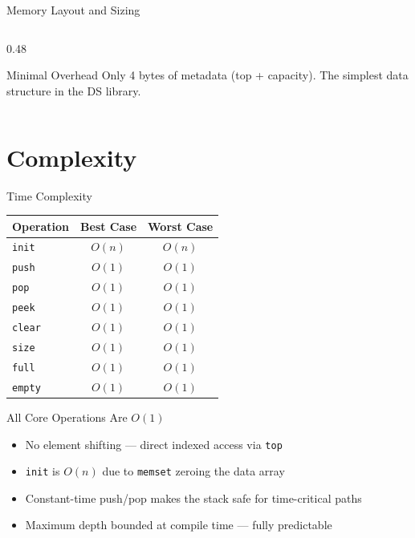 \documentclass[aspectratio=169, 10pt]{beamer}
\begin{document}
\begin{frame}{Memory Layout and Sizing}
\begin{columns}[T]
\begin{column}{0.48\textwidth}
\vspace{0.3em}
\begin{alertblock}{Minimal Overhead}
Only 4 bytes of metadata (top + capacity).
The simplest data structure in the DS library.
\end{alertblock}
\end{column}
\end{columns}
\end{frame}

\section{Complexity}

\begin{frame}{Time Complexity}
\begin{table}
\centering
\begin{tabular}{@{}lcc@{}}
\toprule
\textbf{Operation} & \textbf{Best Case} & \textbf{Worst Case} \\
\midrule
\texttt{init}   & $O(n)$ & $O(n)$ \\
\texttt{push}   & $O(1)$ & $O(1)$ \\
\texttt{pop}    & $O(1)$ & $O(1)$ \\
\texttt{peek}   & $O(1)$ & $O(1)$ \\
\texttt{clear}  & $O(1)$ & $O(1)$ \\
\texttt{size}   & $O(1)$ & $O(1)$ \\
\texttt{full}   & $O(1)$ & $O(1)$ \\
\texttt{empty}  & $O(1)$ & $O(1)$ \\
\bottomrule
\end{tabular}
\end{table}

\vspace{0.5em}
\begin{block}{All Core Operations Are $O(1)$}
\begin{itemize}
  \item No element shifting --- direct indexed access via \texttt{top}
  \item \texttt{init} is $O(n)$ due to \texttt{memset} zeroing the data array
  \item Constant-time push/pop makes the stack safe for time-critical paths
  \item Maximum depth bounded at compile time --- fully predictable
\end{itemize}
\end{block}
\end{frame}
\end{document}
